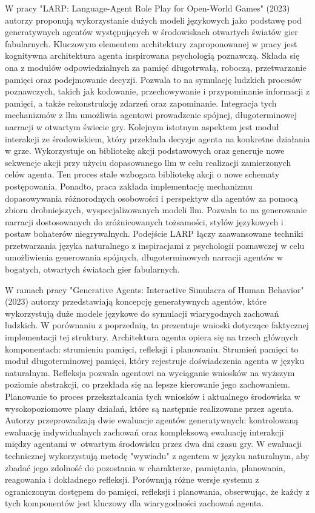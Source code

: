 W pracy "LARP: Language-Agent Role Play for Open-World Games" (2023)\cite{larp_language} autorzy
proponują wykorzystanie dużych modeli językowych jako podstawę pod generatywnych agentów
występujących w środowiskach otwartych światów gier fabularnych. Kluczowym elementem architektury
zaproponowanej w pracy jest kognitywna architektura agenta inspirowana psychologią poznawczą. Składa
się ona z modułów odpowiedzialnych za pamięć długotrwałą, roboczą, przetwarzanie pamięci oraz
podejmowanie decyzji. Pozwala to na symulację ludzkich procesów poznawczych, takich jak kodowanie,
przechowywanie i przypominanie informacji z pamięci, a także rekonstrukcję zdarzeń oraz zapominanie.
Integracja tych mechanizmów z \gls{llm} umożliwia agentowi prowadzenie spójnej, długoterminowej narracji w
otwartym świecie gry. Kolejnym istotnym aspektem jest moduł interakcji ze środowiskiem, który przekłada
decyzje agenta na konkretne działania w grze. Wykorzystuje on bibliotekę akcji podstawowych oraz generuje
nowe sekwencje akcji przy użyciu dopasowanego \gls{llm} w celu realizacji zamierzonych celów agenta. Ten proces
stale wzbogaca bibliotekę akcji o nowe schematy postępowania. Ponadto, praca zakłada implementację
mechanizmu dopasowywania różnorodnych osobowości i perspektyw dla agentów za pomocą zbioru
drobniejszych, wyspecjalizowanych modeli \gls{llm}. Pozwala to na generowanie narracji dostosowanych do
zróżnicowanych tożsamości, stylów językowych i postaw bohaterów niegrywalnych. Podejście LARP łączy
zaawansowane techniki przetwarzania języka naturalnego z inspiracjami z psychologii poznawczej w celu
umożliwienia generowania spójnych, długoterminowych narracji agentów w bogatych, otwartych światach gier
fabularnych\cite{larp_language}.

W ramach pracy "Generative Agents: Interactive Simulacra of Human Behavior" (2023)\cite{ai_town_ref} autorzy przedstawiają koncepcję
generatywnych agentów, które wykorzystują duże modele językowe do symulacji wiarygodnych zachowań
ludzkich. W porównaniu z poprzednią, ta prezentuje wnioski dotyczące faktycznej implementacji tej struktury.
Architektura agenta opiera się na trzech głównych komponentach: strumieniu pamięci, refleksji
i planowaniu. Strumień pamięci to moduł długoterminowej pamięci, który rejestruje doświadczenia agenta
w języku naturalnym. Refleksja pozwala agentowi na wyciąganie wniosków na wyższym poziomie abstrakcji,
co przekłada się na lepsze kierowanie jego zachowaniem. Planowanie to proces przekształcania tych
wniosków i aktualnego środowiska w wysokopoziomowe plany działań, które są następnie realizowane przez
agenta. Autorzy przeprowadzają dwie ewaluacje agentów generatywnych: kontrolowaną ewaluację indywidualnych
zachowań oraz kompleksową ewaluację interakcji między agentami w~otwartym środowisku przez dwa dni czasu gry.
W ewaluacji technicznej wykorzystują metodę "wywiadu" z agentem w języku naturalnym, aby zbadać jego zdolność
do pozostania w charakterze, pamiętania, planowania, reagowania i dokładnego refleksji. Porównują różne
wersje systemu z ograniczonym dostępem do pamięci, refleksji i planowania, obserwując, że każdy z tych
komponentów jest kluczowy dla wiarygodności zachowań agenta\cite{ai_town_ref}.

